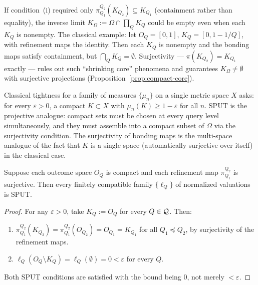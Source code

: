 \begin{remark}
If condition~(i) required only $\pi^{Q_2}_{Q_1}(K_{Q_2}) \subseteq
K_{Q_1}$ (containment rather than equality), the inverse limit
$K_\Omega := \Omega \cap \prod_Q K_Q$ could be empty even when each
$K_Q$ is nonempty.  The classical example: let $O_Q = [0,1]$,
$K_Q = [0, 1-1/Q]$, with refinement maps the identity.  Then each
$K_Q$ is nonempty and the bonding maps satisfy containment, but
$\bigcap_Q K_Q = \emptyset$.  Surjectivity --- $\pi(K_{Q_2})
= K_{Q_1}$ exactly --- rules out such ``shrinking core'' phenomena and
guarantees $K_\Omega \neq \emptyset$ with surjective projections
(Proposition~\ref{prop:compact-core}).
\end{remark}

\begin{remark}
Classical tightness for a family of measures $\{\mu_n\}$ on a single
metric space $X$ asks: for every $\varepsilon > 0$, a compact
$K \subset X$ with $\mu_n(K) \geq 1-\varepsilon$ for all $n$.  SPUT
is the projective analogue: compact sets must be chosen at every
query level simultaneously, and they must assemble into a compact
subset of $\Omega$ via the surjectivity condition.  The surjectivity
of bonding maps is the multi-space analogue of the fact that $K$ is
a single space (automatically surjective over itself) in the
classical case.
\end{remark}

\begin{proposition}
\label{prop:compact-implies-sput}
Suppose each outcome space $O_Q$ is compact and each refinement map
$\pi^{Q_2}_{Q_1}$ is surjective.  Then every finitely compatible
family $\{\ell_Q\}$ of normalized valuations is SPUT.
\end{proposition}

\begin{proof}
For any $\varepsilon > 0$, take $K_Q := O_Q$ for every $Q \in \mathcal{Q}$.
Then:
\begin{enumerate}[label=(\roman*)]
\item $\pi^{Q_2}_{Q_1}(K_{Q_2}) = \pi^{Q_2}_{Q_1}(O_{Q_2}) = O_{Q_1}
  = K_{Q_1}$ for all $Q_1 \preceq Q_2$, by surjectivity of the
  refinement maps.
\item $\ell_Q(O_Q \setminus K_Q) = \ell_Q(\emptyset) = 0 < \varepsilon$
  for every $Q$.
\end{enumerate}
Both SPUT conditions are satisfied with the bound being $0$, not
merely $< \varepsilon$.
\end{proof}

